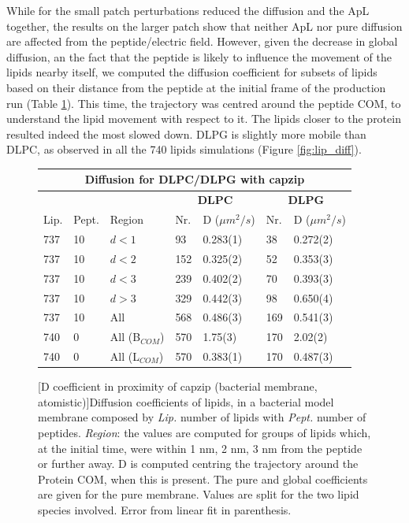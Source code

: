 While for the small patch perturbations reduced the diffusion and the ApL together, the results on the larger patch show that neither ApL nor pure diffusion are affected from the peptide/electric field.
%
However, given the decrease in global diffusion, an the fact that the peptide is likely to influence the movement of the lipids nearby itself, we computed the diffusion coefficient for subsets of lipids based on their distance from the peptide at the initial frame of the production run (Table \ref{table:D_space}). This time, the trajectory was centred around the peptide COM, to understand the lipid movement with respect to it. The lipids closer to the protein resulted indeed the most slowed down. DLPG is slightly more mobile than DLPC, as observed in all the 740 lipids simulations (Figure \ref{fig:lip_diff}).
%
\begin{figure}[p!]
\centering
 \def\arraystretch{1.6}
\begin{tabular}{lll|ll|ll}
\multicolumn{7}{c}{\textbf{Diffusion for DLPC/DLPG with capzip}} \\
\hline
& & & \multicolumn{2}{c|}{\textbf{DLPC}} & \multicolumn{2}{c}{\textbf{DLPG}} \\
 \hline
Lip. & Pept. & Region & Nr. & D ($\mu m^2/s$) & Nr. & D ($\mu m^2/s$) \\
 \hline
737 & 10 & $d<1$ & 93 & 0.283(1) & 38 & 0.272(2)  \\
737 & 10 & $d<2$ & 152 & 0.325(2) & 52 & 0.353(3) \\
737 & 10 & $d<3$ & 239 & 0.402(2) & 70 & 0.393(3) \\
737 & 10 & $d>3$ & 329 & 0.442(3) & 98 & 0.650(4) \\
737 & 10 & All & 568 & 0.486(3) & 169 & 0.541(3) \\
 \hline
740 & 0 & All (B$_{COM}$) & 570 & 1.75(3) & 170 & 2.02(2) \\
740 & 0 & All (L$_{COM}$) & 570 & 0.383(1) & 170 & 0.487(3) \\
 \hline
 \end{tabular}
[D coefficient in proximity of capzip (bacterial membrane, atomistic)]{Diffusion coefficients of lipids, in a bacterial model membrane composed by \emph{Lip.} number of lipids with \emph{Pept.} number of peptides. \emph{Region}: the values are computed for groups of lipids which, at the initial time, were within 1 nm, 2 nm, 3 nm from the peptide or further away. D is computed centring the trajectory around the Protein COM, when this is present. The pure and global coefficients are given for the pure membrane. Values are split for the two lipid species involved. Error from linear fit in parenthesis.}
\label{table:D_space}


\end{figure}
